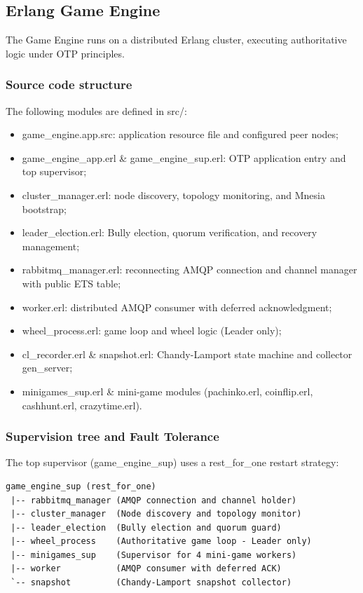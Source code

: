 \documentclass[12pt,a4paper]{article}
\begin{document}
\subsection{Erlang Game Engine}
The Game Engine runs on a distributed Erlang cluster, executing authoritative logic under OTP principles.

\subsubsection{Source code structure}
The following modules are defined in src/:
\begin{itemize}
    \item game\_\allowbreak engine.app.src: application resource file and configured peer nodes;
    \item game\_\allowbreak engine\_\allowbreak app.erl \& game\_\allowbreak engine\_\allowbreak sup.erl: OTP application entry and top supervisor;
    \item cluster\_\allowbreak manager.erl: node discovery, topology monitoring, and Mnesia bootstrap;
    \item leader\_\allowbreak election.erl: Bully election, quorum verification, and recovery management;
    \item rabbitmq\_\allowbreak manager.erl: reconnecting AMQP connection and channel manager with public ETS table;
    \item worker.erl: distributed AMQP consumer with deferred acknowledgment;
    \item wheel\_\allowbreak process.erl: game loop and wheel logic (Leader only);
    \item cl\_\allowbreak recorder.erl \& snapshot.erl: Chandy-Lamport state machine and collector gen\_\allowbreak server;
    \item minigames\_\allowbreak sup.erl \& mini-game modules (pachinko.erl, coinflip.erl, cashhunt.erl, crazytime.erl).
\end{itemize}

\subsubsection{Supervision tree and Fault Tolerance}
The top supervisor (game\_\allowbreak engine\_\allowbreak sup) uses a rest\_\allowbreak for\_\allowbreak one restart strategy:
\begin{lstlisting}[basicstyle=\ttfamily, breaklines=true]
game_engine_sup (rest_for_one)
 |-- rabbitmq_manager (AMQP connection and channel holder)
 |-- cluster_manager  (Node discovery and topology monitor)
 |-- leader_election  (Bully election and quorum guard)
 |-- wheel_process    (Authoritative game loop - Leader only)
 |-- minigames_sup    (Supervisor for 4 mini-game workers)
 |-- worker           (AMQP consumer with deferred ACK)
 `-- snapshot         (Chandy-Lamport snapshot collector)
\end{lstlisting}
\end{document}
